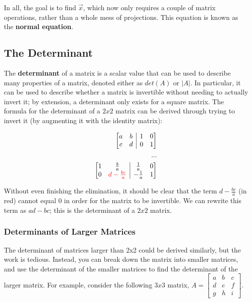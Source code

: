\documentclass[12pt]{article}
\begin{document}
In all, the goal is to find $\vec{x}$, which now only requires a couple of matrix operations, rather than a whole mess of projections. This equation is known as the \textbf{normal equation}.

\subsection{The Determinant}

The \textbf{determinant} of a matrix is a scalar value that can be used to describe many properties of a matrix, denoted either as $det(A)$ or $|A|$. In particular, it can be used to describe whether a matrix is invertible without needing to actually invert it; by extension, a determinant only exists for a square matrix. The formula for the determinant of a $2x2$ matrix can be derived through trying to invert it (by augmenting it with the identity matrix):

\begin{equation}
    \begin{split}
        \begin{array}[t][{@{}cc|cc@{}}]
            a & b & 1 & 0 \\
            c & d & 0 & 1 \\
        \end{array}\\
        ...\\
        \begin{array}[t][{@{}cc|cc@{}}]
            1 & \frac{b}{a} & \frac{1}{a} & 0 \\
            0 & \red{d-\frac{bc}{a}} & -\frac{1}{a} & 1 \\
        \end{array}\\
    \end{split}
\end{equation}

Without even finishing the elimination, it should be clear that the term $d-\frac{bc}{a}$ (in red) cannot equal 0 in order for the matrix to be invertible. We can rewrite this term as $ad-bc$; this is the determinant of a $2x2$ matrix. 

\subsubsection{Determinants of Larger Matrices}

The determinant of matrices larger than 2x2 could be derived similarly, but the work is tedious. Instead, you can break down the matrix into smaller matrices, and use the determinant of the smaller matrices to find the determinant of the larger matrix. For example, consider the following $3x3$ matrix, $A = \begin{bmatrix}
    a & b & c\\
    d & e & f\\
    g & h & i
\end{bmatrix}$. 
\end{document}
